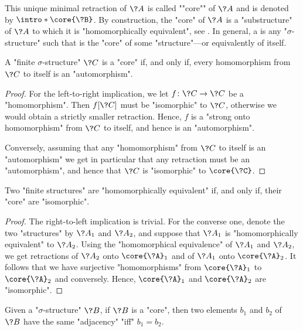 This unique minimal retraction of $\?A$ is called \AP""core"" of $\?A$ and
is denoted by \AP$\intro*\core{\?B}$.
By construction, the "core" of $\?A$ is a "substructure" of $\?A$ to which it is "homomorphically equivalent", see .
In general, a  is any "$\sigma$-structure" such that is the "core" of
some "structure"---or equivalently of itself.

\begin{proposition}
	\AP\label{prop:core-iff-hom-are-auto}
	A "finite $\sigma$-structure" $\?C$ is a "core" if, and only if, every
	homomorphism from $\?C$ to itself is an "automorphism".
\end{proposition}

\begin{proof}
	For the left-to-right implication,
	we let $f\colon \?C \to \?C$ be a "homomorphism".
	Then $f[\?C]$ must be "isomorphic" to $\?C$, otherwise we would obtain
	a strictly smaller retraction. Hence, $f$ is a "strong onto homomorphism"
	from $\?C$ to itself, and hence is an "automorphism".
	
	Conversely, assuming that any "homomorphism" from $\?C$ to itself is an "automorphism"
	we get in particular that any retraction must be an "automorphism", and
	hence that $\?C$ is "isomorphic" to $\core{\?C}$.
\end{proof}

\begin{proposition}
	\AP\label{prop:equiv-core-isomorphic}
	Two "finite structures" are "homomorphically equivalent" if,
	and only if, their "core" are "isomorphic".
\end{proposition}

\begin{proof}
	The right-to-left implication is trivial.
	For the converse one, denote the two "structures" by $\?A_1$ and $\?A_2$,
	and suppose that $\?A_1$ is "homomorphically equivalent" to $\?A_2$.
	Using the "homomorphical equivalence" of $\?A_1$ and $\?A_2$,
	we get retractions of $\?A_2$ onto $\core{\?A}_1$ and of $\?A_1$ onto $\core{\?A}_2$.
	It follows that we have surjective "homomorphisms" from $\core{\?A}_1$ to $\core{\?A}_2$
	and conversely. Hence, $\core{\?A}_1$ and $\core{\?A}_2$ are "isomorphic".
\end{proof}

\begin{proposition}
	\AP\label{prop:adjacency-core}
	Given a "$\sigma$-structure" $\?B$, if $\?B$ is a "core", then
	two elements $b_1$ and $b_2$ of $\?B$ have the same "adjacency" "iff" $b_1 = b_2$.
\end{proposition}

